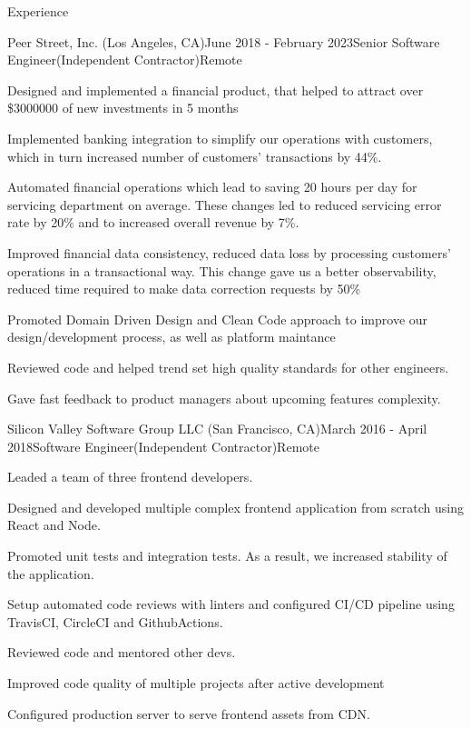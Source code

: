 \documentclass{resume}
\begin{document}
  \begin{rSection}{Experience}
    \begin{rSubsection}{Peer Street, Inc. (Los Angeles, CA)}{June 2018 - February 2023}{Senior Software Engineer(Independent Contractor)}{Remote}
    \item Designed and implemented a financial product, that helped to attract over \$3000000 of new investments in 5 months
    \item Implemented banking integration to simplify our operations with customers, which in turn increased number of customers' transactions by 44\%.
    \item Automated financial operations which lead to saving 20 hours per day for servicing department on average. These changes led to reduced servicing error rate by 20\% and to increased overall revenue by 7\%.
    \item Improved financial data consistency, reduced data loss by processing customers' operations in a transactional way. This change gave us a better observability, reduced time required to make data correction requests by 50\%
    \item Promoted Domain Driven Design and Clean Code approach to improve our design/development process, as well as platform maintance
    \item Reviewed code and helped trend set high quality standards for other engineers.
    \item Gave fast feedback to product managers about upcoming features complexity.
    \end{rSubsection}

    \begin{rSubsection}{Silicon Valley Software Group LLC (San Francisco, CA)}{March 2016 - April 2018}{Software Engineer(Independent Contractor)}{Remote}
    \item Leaded a team of three frontend developers.
    \item Designed and developed multiple complex frontend application from scratch using React and Node.
    \item Promoted unit tests and integration tests. As a result, we increased stability of the application.
    \item Setup automated code reviews with linters and configured CI/CD pipeline using TravisCI, CircleCI and GithubActions.
    \item Reviewed code and mentored other devs.
    \item Improved code quality of multiple projects after active development
    \item Configured production server to serve frontend assets from CDN.
    \end{rSubsection}


\end{rSection}
\end{document}
